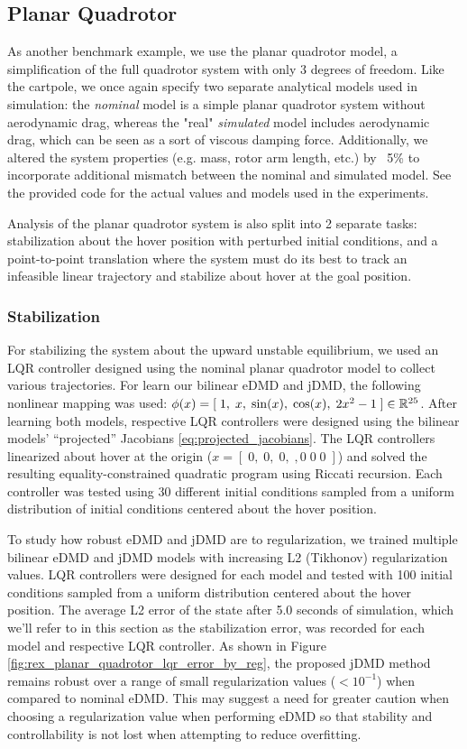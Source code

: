 \documentclass{article}
\begin{document}
\subsection{Planar Quadrotor}
As another benchmark example, we use the planar quadrotor model, a simplification of the full quadrotor system with only 3 degrees of freedom. Like the cartpole, we once again specify two separate analytical models used in simulation: the \textit{nominal} model is a simple planar quadrotor system without aerodynamic drag, whereas the "real" \textit{simulated} model includes aerodynamic drag, which can be seen as a sort of viscous damping force. Additionally, we altered the system properties (e.g. mass, rotor arm length, etc.) by ~5\% to incorporate additional mismatch between the nominal and simulated model. See the provided code for the actual values and models used in the experiments.

Analysis of the planar quadrotor system is also split into 2 separate tasks: stabilization
about the hover position with perturbed initial conditions, and a point-to-point translation
where the system must do its best to track an infeasible linear trajectory and stabilize
about hover at the goal position.

\subsubsection{Stabilization}
For stabilizing the system about the upward unstable equilibrium, we used an LQR controller
designed using the nominal planar quadrotor model to collect various trajectories. For learn our bilinear eDMD and jDMD, the following nonlinear mapping was used: $\phi(x) = [\; 1,\; x,\; \sin(x),\; \cos(x),\; 2x^{2}-1\; ] \in \mathbb{R}^{25}$. After learning both models, respective LQR controllers were designed using the bilinear models' ``projected'' Jacobians \eqref{eq:projected_jacobians}. The LQR controllers linearized about hover at the origin ($x = [\;0,\; 0,\; 0,\;, 0\;  0\;  0\;]$) and solved the resulting equality-constrained quadratic program using Riccati recursion. Each controller was tested using 30 different initial
conditions sampled from a uniform distribution of initial conditions centered about the hover position.

To study how robust eDMD and jDMD are to regularization, we trained multiple bilinear eDMD and jDMD models with increasing L2 (Tikhonov) regularization values. LQR controllers were designed for each model and tested with 100 initial conditions sampled from a uniform distribution centered about the hover position. The average L2 error of the state after 5.0 seconds of simulation, which we'll refer to in this section as the stabilization error, was recorded for each model and respective LQR controller. As shown in Figure \ref{fig:rex_planar_quadrotor_lqr_error_by_reg}, the proposed jDMD method remains robust over a range of small regularization values ($<10^{-1}$) when compared to nominal eDMD. This may suggest a need for greater caution when choosing a regularization value when performing eDMD so that stability and controllability is not lost when attempting to reduce overfitting.
\end{document}
